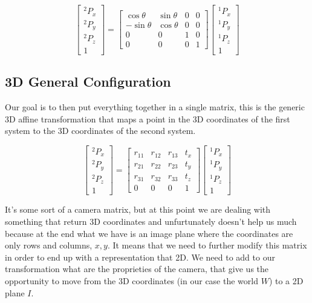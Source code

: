 \[
    \begin{bmatrix}
        {}^2P_x \\
        {}^2P_y \\
        {}^2P_z \\
        1
    \end{bmatrix}
    =
    \begin{bmatrix}
        \cos\theta & \sin\theta & 0 & 0 \\
        -\sin\theta & \cos\theta & 0 & 0 \\
        0 & 0 & 1 & 0 \\
        0 & 0 & 0 & 1
    \end{bmatrix}
    \begin{bmatrix}
        {}^1P_x \\
        {}^1P_y \\
        {}^1P_z \\
        1
    \end{bmatrix}   
\]

\subsection{3D General Configuration}

Our goal is to then put everything together in a single matrix, this is the generic 3D affine transformation that maps a point in the 3D coordinates of the first system to the 3D coordinates of the second system.

\[
    \begin{bmatrix}
        {}^2P_x \\
        {}^2P_y \\
        {}^2P_z \\
        1
    \end{bmatrix}
    =
    \begin{bmatrix}
       r_{11} & r_{12} & r_{13} & t_x \\
       r_{21} & r_{22} & r_{23} & t_y \\
       r_{31} & r_{32} & r_{33} & t_z \\
        0 & 0 & 0 & 1
    \end{bmatrix}
    \begin{bmatrix}
        {}^1P_x \\
        {}^1P_y \\
        {}^1P_z \\
        1
    \end{bmatrix}   
\]

It's some sort of a camera matrix, but at this point we are dealing with something that return 3D coordinates and unfurtunately doesn't help us much because at the end what we have is an image plane where the coordinates are only rows and columns, \(x, y\). It means that we need to further modify this matrix in order to end up with a representation that 2D. We need to add to our transformation what are the proprieties of the camera, that give us the opportunity to move from the 3D coordinates (in our case the world \(W\)) to a 2D plane \(I\).

